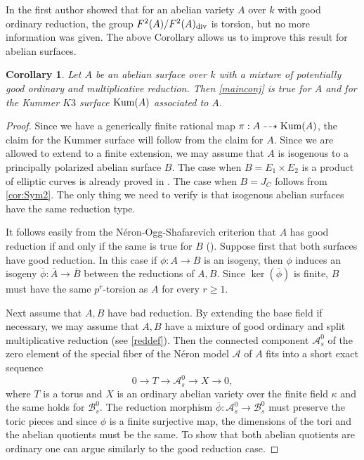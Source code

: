 \documentclass[12pt]{amsart}
\newtheorem{cor}[cor]{Corollary}
\theoremstyle{remark}
\renewcommand{\1}{{\mathbb{S}}}
\newcommand{\<}{\langle}
\renewcommand{\>}{\rangle}
\newcommand{\Kum}{{\rm Kum}}
\newcommand{\dv}{{\rm div}}
\begin{document}
In \cite{Gaz19} the first author showed that for an abelian variety $A$ over $k$ with good ordinary reduction, the group $F^2(A)/F^2(A)_{\dv}$ is torsion, but no more information was given. The above Corollary allows us to  improve this result for abelian surfaces. 
\begin{cor}\label{cor:absurface} Let $A$ be an abelian surface over $k$ with a mixture of potentially good ordinary and multiplicative reduction. Then \autoref{mainconj} is true for $A$ and for the Kummer $K3$ surface $\Kum(A)$ associated to $A$. 
\end{cor}
\begin{proof} Since we have a generically finite rational map $\pi: A\dashrightarrow \Kum(A)$, the claim for the Kummer surface will follow from the claim for $A$. 
Since we are allowed to extend to a finite extension, we may assume that $A$ is isogenous to a principally polarized abelian surface $B$. 
The case when $B=E_1\times E_2$ is a product of elliptic curves is already proved in \cite[Theorem 1.2]{GL24}. The case when $B=J_C$ follows from \autoref{cor:Sym2}. The only thing we need to verify is that isogenous abelian surfaces have the same reduction type. 

It follows easily from the N\'{e}ron-Ogg-Shafarevich criterion that  $A$ has good reduction if and only if the same is true for $B$ (\cite[VII, Corollary 7.2]{Sil}). Suppose first that both surfaces have good reduction. In this case if $\phi:A\to B$ is an isogeny, then $\phi$ induces an isogeny $\overline{\phi}: \overline{A}\to\overline{B}$ between the reductions of $A, B$. Since $\ker(\overline{\phi})$ is finite, $B$ must have the same $p^r$-torsion as $A$ for every $r\geq 1$. 

Next assume that $A, B$ have bad reduction. By extending the base field if necessary, we may assume that $A, B$ have a mixture of good ordinary and split multiplicative reduction (see \autoref{reddef}). Then the connected component $\mathcal{A}_s^0$ of the zero element of the special fiber of the N\'{e}ron model $\mathcal{A}$ of $A$ fits into a short exact sequence 
\[0\to T\to \mathcal{A}_s^0\to X\to 0,\] where $T$ is a torus and $X$ is an ordinary abelian variety over the finite field $\kappa$ and the same holds for $\mathcal{B}_s^0$. The reduction morphism $\overline{\phi}: \mathcal{A}_s^0\to \mathcal{B}_s^0$ must preserve the toric pieces and since $\phi$ is a finite surjective map, the dimensions of the tori and the abelian quotients must be the same. To show that both abelian quotients are ordinary one can argue similarly to the good reduction case. 


 


\end{proof}
\end{document}
